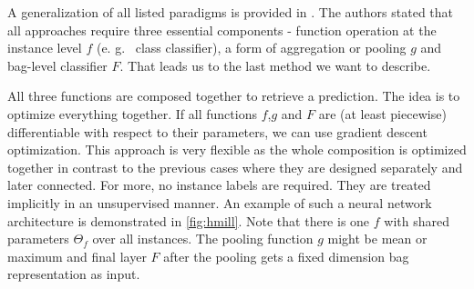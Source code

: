 A generalization of all listed paradigms is provided in \cite{Mandlik2020}. The authors stated that all approaches require three essential components - function operation at the instance level $f$ (e. g. \ class classifier), a form of aggregation or pooling $g$ and bag-level classifier $F$. That leads us to the last method we want to describe.

All three functions are composed together to retrieve a prediction. The idea is to optimize everything together. If all functions $f$,$g$ and $F$ are (at least piecewise) differentiable with respect to their parameters, we can use gradient descent optimization. \cite{Pevny2016a, Edwards2017} This approach is very flexible as the whole composition is optimized together in contrast to the previous cases where they are designed separately and later connected. For more, no instance labels are required. They are treated implicitly in an unsupervised manner. An example of such a neural network architecture is demonstrated in \ref{fig:hmill}. Note that there is one $f$ with shared parameters $\Theta_{f}$ over all instances. The pooling function $g$ might be mean or maximum and final layer $F$ after the pooling gets a fixed dimension bag representation as input.

